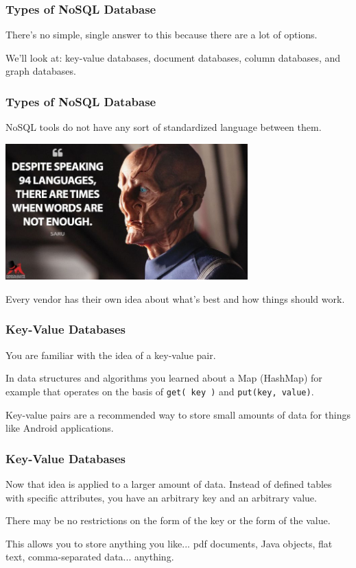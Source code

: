 \begin{frame}
\frametitle{Types of NoSQL Database}

There's no simple, single answer to this because there are a lot of options. 

We'll look at: key-value databases, document databases, column databases, and graph databases.

\end{frame}



\begin{frame}
\frametitle{Types of NoSQL Database}

NoSQL tools do not have any sort of standardized language between them.

\begin{center}
	\includegraphics[width=0.7\textwidth]{images/saru.jpg}
\end{center}

Every vendor has their own idea about what's best and how things should work. 


\end{frame}



\begin{frame}
\frametitle{Key-Value Databases}

You are familiar with the idea of a key-value pair. 

In data structures and algorithms you learned about a Map (HashMap) for example that operates on the basis of \texttt{get( key )} and \texttt{put(key, value)}. 

Key-value pairs are a recommended way to store small amounts of data for things like Android applications. 

\end{frame}



\begin{frame}
\frametitle{Key-Value Databases}

Now that idea is applied to a larger amount of data. Instead of defined tables with specific attributes, you have an arbitrary key and an arbitrary value. 

There may be no restrictions on the form of the key or the form of the value.

This allows you to store anything you like... pdf documents, Java objects, flat text, comma-separated data... anything.


\end{frame}



